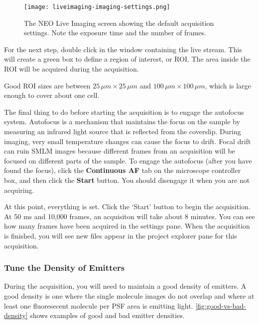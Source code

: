 \documentclass[10pt,a4paper,oneside]{book}
\begin{document}
\begin{figure}[ht]
    \centering
    \texttt{[image: liveimaging-imaging-settings.png]}
    \caption{The NEO Live Imaging screen showing the default acquisition settings. Note the exposure time and the number of frames.}
    \label{fig:liveimaging-imaging-settings}
\end{figure}

For the next step, double click in the window containing the live stream. This will create a green box to define a region of interest, or ROI. The area inside the ROI will be acquired during the acquisition.

\newline

Good ROI sizes are between $25 \, \mu m\times 25 \, \mu m$ and $100 \, \mu m\times 100 \, \mu m$, which is large enough to cover about one cell.

The final thing to do before starting the acquisition is to engage the autofocus system. Autofocus is a mechanism that maintains the focus on the sample by measuring an infrared light source that is reflected from the coverslip. During imaging, very small temperature changes can cause the focus to drift. Focal drift can ruin SMLM images because different frames from an acquisition will be focused on different parts of the sample. To engage the autofocus (after you have found the focus), click the \textbf{Continuous AF} tab on the microscope controller box, and then click the \textbf{Start} button. You should disengage it when you are not acquiring.

At this point, everything is set. Click the `Start' button to begin the acquisition. At 50 ms and 10,000 frames, an acquisiton will take about 8 minutes. You can see how many frames have been acquired in the settings pane. When the acquisition is finished, you will see new files appear in the project explorer pane for this acquisition.

\subsubsection{Tune the Density of Emitters}

During the acquisition, you will need to maintain a good density of emitters. A good density is one where the single molecule images do not overlap and where at least one fluoresecent molecule per PSF area is emitting light. \autoref{fig:good-vs-bad-density} shows examples of good and bad emitter densities.
\end{document}
